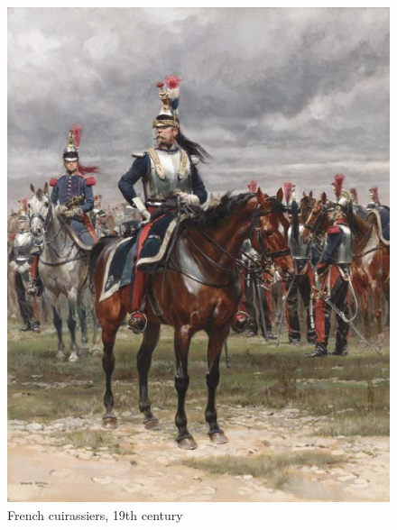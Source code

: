\documentclass{article}
\begin{document}
\begin{figure}[H]
	\begin{centering}
	\includegraphics[width=0.5\paperwidth]{../ressources/cuirassiers}
	\caption{French cuirassiers, 19th century \cite{heavy_cavalry}}
	\end{centering}
\end{figure}
\end{document}
